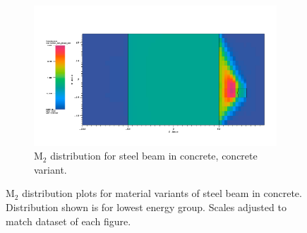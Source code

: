 \begin{figure}[htb!]\ContinuedFloat
  \centering
  \begin{subfigure}[t]{\textwidth}
    \includegraphics[width=0.9\linewidth]{./chapters/characterization_probs/figures/char/prob1v2/prob1v2M2G26.png}
    \caption{M$_2$ distribution for steel beam in concrete, concrete variant.}
    \label{fig:M2concrete}
  \end{subfigure}
  \caption[M$_2$ distribution plots for material variants of steel beam in
  concrete.]{M$_2$ distribution plots for material variants of steel beam in
  concrete. Distribution shown is for lowest energy group. Scales adjusted to
  match dataset of each figure.}
  \label{fig:M2beamplots}
\end{figure}


